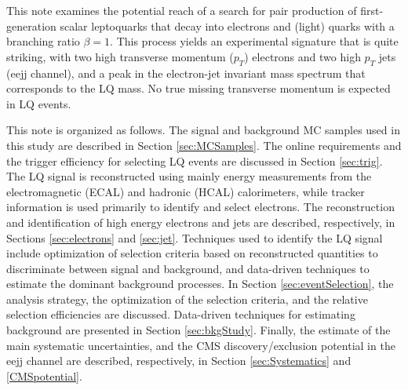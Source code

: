 This note examines the potential reach of a search for
pair production of first-generation 
scalar leptoquarks that decay into electrons and 
(light) quarks with a branching ratio $\beta=1$. 
This process yields an experimental signature that
is quite striking, with two 
high transverse momentum ($p_T$) electrons 
and two high $p_T$ jets (eejj channel), and
a peak in the electron-jet invariant mass 
spectrum that corresponds to the LQ mass. 
No true missing transverse momentum is expected in LQ events.

%
This note is organized as follows. 
The signal and background MC samples used in this study are described in Section \ref{sec:MCSamples}.
The online requirements and the trigger efficiency for selecting LQ events are discussed in Section \ref{sec:trig}.
The LQ signal is reconstructed using mainly energy measurements from the
electromagnetic (ECAL) and hadronic (HCAL) calorimeters, while tracker information 
is used primarily to identify and select electrons. 
The reconstruction and identification of high energy electrons and jets are described, respectively, 
in Sections \ref{sec:electrons} and \ref{sec:jet}.
Techniques used to identify the LQ signal include optimization of selection criteria based on 
reconstructed quantities to discriminate between signal and background, 
and data-driven techniques to estimate the dominant background processes.
In Section \ref{sec:eventSelection}, the analysis strategy, the optimization of the selection criteria, 
and the relative selection efficiencies are discussed. 
Data-driven techniques for estimating background are presented in Section \ref{sec:bkgStudy}.
Finally, the estimate of the main systematic uncertainties, and the CMS discovery/exclusion potential 
in the eejj channel are described, respectively, in Section \ref{sec:Systematics} and \ref{CMSpotential}.




%
